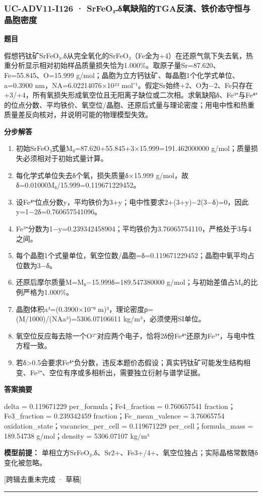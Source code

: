 \documentclass[UTF8,11pt,a4paper]{ctexart}
\begin{document}
\subsubsection*{UC-ADV11-I126 · SrFeO₃₋δ氧缺陷的TGA反演、铁价态守恒与晶胞密度}
\noindent\textbf{题目}\par
假想钙钛矿SrFeO₃₋δ从完全氧化的SrFeO₃（Fe全为+4）在还原气氛下失去氧，热重分析显示相对初始样品质量损失恰为1.000\%。取原子量Sr=87.620、Fe=55.845、O=15.999 g/mol；晶胞为立方钙钛矿、每晶胞1个化学式单位、a=0.3900 nm，NA=6.02214076×10²³ mol⁻¹。假定Sr始终+2、O为−2、Fe只存在+3/+4，所有氧损失形成氧空位且无阳离子缺位或二次相。求氧缺陷δ、Fe³⁺与Fe⁴⁺的位点分数、平均铁价、氧空位/晶胞、还原后式量与理论密度；用电中性和热重质量差反向核对，并说明可能的物理模型失效。\par
\medskip\noindent\textbf{分步解答}
\begin{enumerate}
\item 初始SrFeO₃式量M₀=87.620+55.845+3×15.999=191.462000000 g/mol；质量损失必须相对于初始式量计算。
\item 每化学式单位失去δ个氧，损失质量δ×15.999 g/mol，故δ=0.01000M₀/15.999=0.119671229452。
\item 设Fe⁴⁺位点分数y，平均铁价为3+y；电中性要求2+(3+y)−2(3−δ)=0，因此y=1−2δ=0.760657541096。
\item Fe³⁺分数为1−y=0.239342458904；平均铁价为3.76065754110，严格处于3与4之间。
\item 每个晶胞1个式量单位，氧空位数/晶胞=δ=0.119671229452；晶胞中氧平均占位数为3−δ。
\item 还原后摩尔质量M=M₀−15.999δ=189.547380000 g/mol；与初始差值占M₀的比例严格为1.000\%。
\item 晶胞体积a³=(0.3900×10⁻⁹ m)³，理论密度ρ=(M/1000)/(NAa³)=5306.07106611 kg/m³，必须使用SI单位。
\item 氧空位反应每去除一个O²⁻对应两个电子，恰将2δ份Fe⁴⁺还原为Fe³⁺，与电中性方程一致。
\item 若δ>0.5会要求Fe⁴⁺负分数，违反本题价态假设；真实钙钛矿可能发生结构相变、Fe²⁺、空位有序或多相析出，需要独立衍射与谱学证据。
\end{enumerate}
\noindent\textbf{答案摘要}\par
delta = 0.119671229 per\_formula；Fe4\_fraction = 0.760657541 fraction；Fe3\_fraction = 0.239342459 fraction；Fe\_mean\_valence = 3.76065754 oxidation\_state；vacancies\_per\_cell = 0.119671229 per\_cell；formula\_mass = 189.54738 g/mol；density = 5306.07107 kg/m³\par
\noindent\textbf{模型前提：}
单相立方SrFeO₃₋δ、Sr2+、Fe3+/4+、氧空位独占；实际晶格常数随δ变化被忽略。\par
\noindent\textcolor{red!65!black}{[跨辑去重未完成 · 草稿]} \par
\medskip\hrule\medskip
{}
\end{document}

